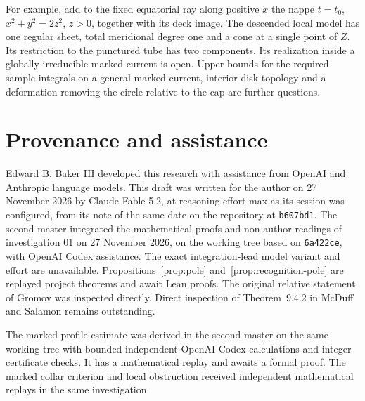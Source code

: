 \documentclass[11pt,letterpaper]{article}
\numberwithin{equation}{section}
\begin{document}
For example, add to the fixed equatorial ray along positive $x$ the
nappe $t=t_0$, $x^2+y^2=2z^2$, $z>0$, together with its deck image.
The descended local model has one regular sheet, total meridional degree
one and a cone at a single point of $Z$. Its restriction to the punctured
tube has two components. Its realization inside a globally irreducible
marked current is open. Upper bounds for the required sample integrals
on a general marked current, interior disk topology and a deformation
removing the circle relative to the cap are further questions.

\section*{Provenance and assistance}
Edward B. Baker III developed this research with assistance from OpenAI
and Anthropic language models. This draft was written for the author on
27 November 2026 by Claude Fable 5.2, at reasoning effort max as its
session was configured, from its note of the same date
\cite{Baker2026PoleFormsProposal} on the repository at
\texttt{b607bd1}. The second master integrated the mathematical proofs and
non-author readings of investigation 01 on 27 November 2026, on the
working tree based on \texttt{6a422ce}, with OpenAI Codex assistance.
The exact integration-lead model variant and effort are unavailable.
Propositions~\ref{prop:pole} and~\ref{prop:recognition-pole} are replayed
project theorems and await Lean proofs. The original relative statement
of Gromov was inspected directly. Direct inspection of Theorem~9.4.2 in
McDuff and Salamon \cite{McDuffSalamon2012JHolomorphic} remains outstanding.

The marked profile estimate was derived in the second master on the same
working tree with bounded independent OpenAI Codex calculations and
integer certificate checks. It has a mathematical replay and awaits a
formal proof. The marked collar criterion and local obstruction received
independent mathematical replays in the same investigation.



\end{document}
